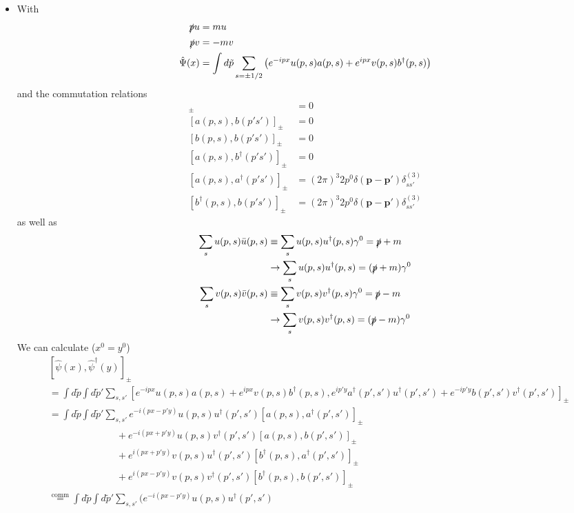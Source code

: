 \documentclass[10pt,a4paper]{report}
\theoremstyle{definition}
\begin{document}
\begin{itemize}
\item With
\begin{align}
\slashed{p}u&=mu\\
\slashed{p}v&=-mv\\
\hat{\Psi}(x)
&=\int d\tilde{p}\sum_{s=\pm1/2}
\left(e^{-ipx}u(p,s)a(p,s)
+e^{ipx}v(p,s)b^\dagger(p,s)\right)
\end{align}
and the commutation relations
\begin{align}
[a(p,s),a(p's')]_\pm&=0\\
[a(p,s),b(p's')]_\pm&=0\\
[b(p,s),b(p's')]_\pm&=0\\
[a(p,s),b^\dagger(p's')]_\pm&=0\\
[a(p,s),a^\dagger(p's')]_\pm&=(2\pi)^3 2p^0\delta(\mathbf{p}-\mathbf{p}')\delta^{(3)}_{ss'}\\
[b^\dagger(p,s),b(p's')]_\pm&=(2\pi)^3 2p^0\delta(\mathbf{p}-\mathbf{p}')\delta^{(3)}_{ss'}
\end{align}
as well as
\begin{align}
\sum_s u(p,s)\bar{u}(p,s)
&\equiv\sum_s u(p,s)u^\dagger(p,s)\gamma^0
=\slashed{p}+m\\
&\rightarrow \sum_s u(p,s)u^\dagger(p,s)
=(\slashed{p}+m)\gamma^0\\
\sum_s v(p,s)\bar{v}(p,s)
&\equiv\sum_s v(p,s)v^\dagger(p,s)\gamma^0
=\slashed{p}-m\\
&\rightarrow \sum_s v(p,s)v^\dagger(p,s)
=(\slashed{p}-m)\gamma^0
\end{align}
We can calculate ($x^0=y^0$)
\begin{align}
&[\hat{\psi}(x),\hat{\psi}^\dagger(y)]_\pm\\
&=\int d\tilde{p}\int d\tilde{p}'\sum_{s,s'}
\left[e^{-ipx}u(p,s)a(p,s)
+e^{ipx}v(p,s)b^\dagger(p,s),
e^{ip'y}a^\dagger(p',s')u^\dagger(p',s')
+e^{-ip'y}b(p',s')v^\dagger(p',s')\right]_\pm\\
&=\int d\tilde{p}\int d\tilde{p}'\sum_{s,s'}
e^{-i(px-p'y)}u(p,s)u^\dagger(p',s')[a(p,s),a^\dagger(p',s')]_\pm\\
&\qquad\qquad\qquad\quad+e^{-i(px+p'y)}u(p,s)v^\dagger(p',s')[a(p,s),b(p',s')]_\pm\\
&\qquad\qquad\qquad\quad+e^{i(px+p'y)}v(p,s)u^\dagger(p',s')[b^\dagger(p,s),a^\dagger(p',s')]_\pm\\
&\qquad\qquad\qquad\quad+e^{i(px-p'y)}v(p,s)v^\dagger(p',s')[b^\dagger(p,s),b(p',s')]_\pm\\
&\overset{\text{comm}}{=}\int d\tilde{p}\int d\tilde{p}'\sum_{s,s'}
(e^{-i(px-p'y)}u(p,s)u^\dagger(p',s')

\end{align}
\end{itemize}
\end{document}
